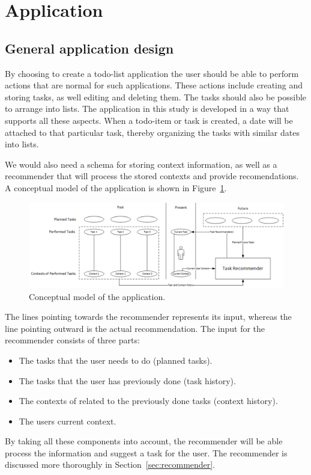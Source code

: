 \section{Application}

\subsection{General application design}
By choosing to create a todo-list application the user should be able to perform actions that are normal for such applications. These actions include creating and storing tasks, as well editing and deleting them. The tasks should also be possible to arrange into lists. The application in this study is developed in a way that supports all these aspects. When a todo-item or task is created, a date will be attached to that particular task, thereby organizing the tasks with similar dates into lists.

We would also need a schema for storing context information, as well as a recommender that will process the stored contexts and provide recomendations. A conceptual model of the application is shown in Figure~\ref{fig:conceptualmodel}.
\begin{figure}[tbp]
  \centering
  \includegraphics[width=\textwidth]{figures/ConceptualDiagram.png}
  \caption[Conceptual model]{Conceptual model of the application.}
  \label{fig:conceptualmodel}
\end{figure}
The lines pointing towards the recommender represents its input, whereas the line pointing outward is the actual recommendation. The input for the recommender consists of three parts:
\begin{itemize}
	\item The tasks that the user needs to do (planned tasks).
	\item The tasks that the user has previously done (task history).
	\item The contexts of related to the previously done tasks (context history).
	\item The users current context.
\end{itemize}
By taking all these components into account, the recommender will be able process the information and suggest a task for the user. The recommender is discussed more thoroughly in Section~\ref{sec:recommender}.

